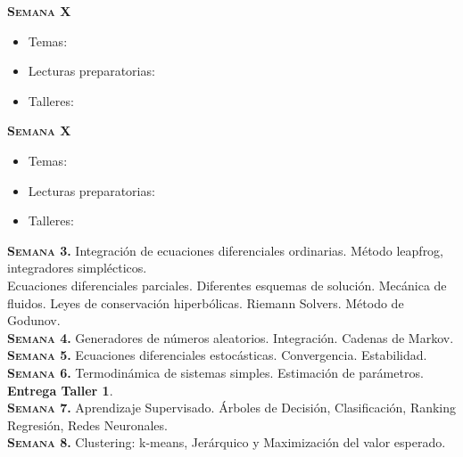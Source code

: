 \documentclass[letterpaper,10pt,onecolumn]{article}
\begin{document}
\noindent\textbf{\textsc{Semana X}}\\[-0.5cm]
\begin{itemize}
\item Temas: \\[-0.6cm]
\item Lecturas preparatorias: \\[-0.6cm]
\item Talleres: \\[-0.6cm]
\end{itemize}

\noindent\textbf{\textsc{Semana X}}\\[-0.5cm]
\begin{itemize}
\item Temas: \\[-0.6cm]
\item Lecturas preparatorias: \\[-0.6cm]
\item Talleres: \\[-0.6cm]
\end{itemize}


\noindent\textbf{\textsc{Semana 3.}} 
Integraci\'on de ecuaciones diferenciales ordinarias. M\'etodo 
leapfrog, integradores simpl\'ecticos.\\
Ecuaciones diferenciales parciales. Diferentes esquemas de
soluci\'on. Mec\'anica de fluidos. Leyes de conservaci\'on
hiperb\'olicas. Riemann Solvers. M\'etodo de Godunov.
\\[-0.3cm]  

\noindent\textbf{\textsc{Semana 4.}} 
Generadores de n\'umeros aleatorios. Integraci\'on. Cadenas de Markov. 
\\[-0.3cm]  

\noindent\textbf{\textsc{Semana 5.}}
Ecuaciones diferenciales estoc\'asticas. Convergencia. Estabilidad.
\\[-0.3cm]

\noindent\textbf{\textsc{Semana 6.}} 
Termodin\'amica de sistemas simples. Estimaci\'on de par\'ametros. 
{\bf Entrega Taller 1}.
\\[-0.3cm]  

\noindent\textbf{\textsc{Semana 7.}} 
Aprendizaje Supervisado. Árboles de Decisión, Clasificación, Ranking
Regresión, Redes Neuronales. 
\\[-0.3cm]  

\noindent\textbf{\textsc{Semana 8.}} 
Clustering: k-means, Jerárquico y Maximización del valor esperado.
\\[-0.3cm] 
\end{document}
